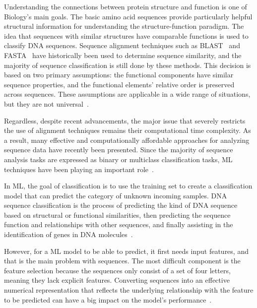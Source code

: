 Understanding the connections between protein structure and function is one of Biology's main goals. The basic amino acid sequences provide particularly helpful structural information for understanding the structure-function paradigm. The idea that sequences with similar structures have comparable functions is used to classify \gls{DNA} sequences. Sequence alignment techniques such as BLAST~\cite{Altschul1990BasicTool} and FASTA~\cite{Pearson1988ImprovedComparison} have historically been used to determine sequence similarity, and the majority of sequence classification is still done by these methods. This decision is based on two primary assumptions: the functional components have similar sequence properties, and the functional elements' relative order is preserved across sequences. These assumptions are applicable in a wide range of situations, but they are not universal~\cite{LoBosco2017DeepClassification}.

Regardless, despite recent advancements, the major issue that severely restricts the use of alignment techniques remains their computational time complexity. As a result, many effective and computationally affordable approaches for analyzing sequence data have recently been presented. Since the majority of sequence analysis tasks are expressed as binary or multiclass classification tasks, \gls{ML} techniques have been playing an important role~\cite{Liu2017BioSeq-Analysis:Approaches}.

In \gls{ML}, the goal of classification is to use the training set to create a classification model that can predict the category of unknown incoming samples. \gls{DNA} sequence classification is the process of predicting the kind of \gls{DNA} sequence based on structural or functional similarities, then predicting the sequence function and relationships with other sequences, and finally assisting in the identification of genes in \gls{DNA} molecules~\cite{Yang2020ReviewDNA}.

However, for a \gls{ML} model to be able to predict, it first needs input features, and that is the main problem with sequences. The most difficult component is the feature selection because the sequences only consist of a set of four letters, meaning they lack explicit features. Converting sequences into an effective numerical representation that reflects the underlying relationship with the feature to be predicted can have a big impact on the model's performance~\cite{LoBosco2017DeepClassification,Chen2019ILearn:Data}.

